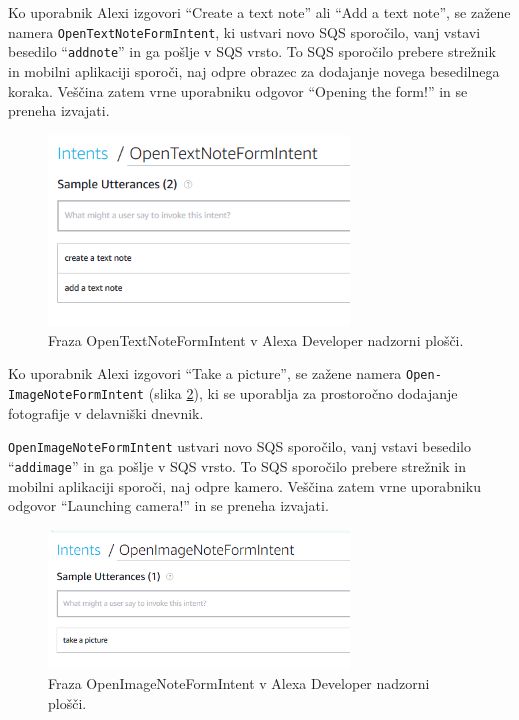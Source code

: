 \documentclass[a4paper, 12pt]{book}
\begin{document}
Ko uporabnik Alexi izgovori \enquote{Create a text note} ali \enquote{Add a text note}, se zažene namera \texttt{OpenTextNoteFormIntent}, ki ustvari novo SQS sporočilo, vanj vstavi besedilo \enquote{\texttt{addnote}} in ga pošlje v SQS vrsto.
To SQS sporočilo prebere strežnik in mobilni aplikaciji sporoči, naj odpre obrazec za dodajanje novega besedilnega koraka.
Veščina zatem vrne uporabniku odgovor \enquote{Opening the form!} in se preneha izvajati.

\begin{figure}[H]
\begin{center}
\includegraphics[width=8cm]{intent_text}
\end{center}
\caption{Fraza OpenTextNoteFormIntent v Alexa Developer nadzorni plošči.}
\label{OpenTextNoteFormIntent}
\end{figure}

Ko uporabnik Alexi izgovori \enquote{Take a picture}, se zažene namera \texttt{Open-\\ImageNoteFormIntent} (slika \ref{OpenImageNoteFormIntent}), ki se uporablja za prostoročno dodajanje fotografije v delavniški dnevnik.

\texttt{OpenImageNoteFormIntent} ustvari novo SQS sporočilo, vanj vstavi besedilo \enquote{\texttt{addimage}} in ga pošlje v SQS vrsto.
To SQS sporočilo prebere strežnik in mobilni aplikaciji sporoči, naj odpre kamero.
Veščina zatem vrne uporabniku odgovor \enquote{Launching camera!} in se preneha izvajati.

\begin{figure}[H]
\begin{center}
\includegraphics[width=8cm]{intent_image}
\end{center}
\caption{Fraza OpenImageNoteFormIntent v Alexa Developer nadzorni plošči.}
\label{OpenImageNoteFormIntent}
\end{figure}
\end{document}
